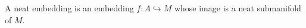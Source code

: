 A neat embedding is an embedding $f: A \hookrightarrow M$ whose image is a neat submanifold of $M$.
